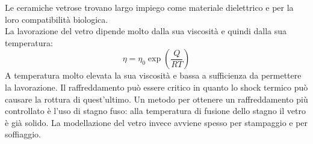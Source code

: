 Le ceramiche vetrose trovano largo impiego come materiale dielettrico e per la loro compatibilità biologica.\\
La lavorazione del vetro dipende molto dalla sua viscosità e quindi dalla sua temperatura:
\begin{equation}
    \eta=\eta_0\exp\left(\frac{Q}{RT}\right)
\end{equation}
A temperatura molto elevata la sua viscosità e bassa a sufficienza da permettere la lavorazione. Il raffreddamento può essere critico in quanto lo shock termico può causare la rottura di quest'ultimo.
Un metodo per ottenere un raffreddamento più controllato è l'uso di stagno fuso: alla temperatura di fusione dello stagno il vetro è già solido. La modellazione del vetro invece avviene spesso per stampaggio e per soffiaggio.